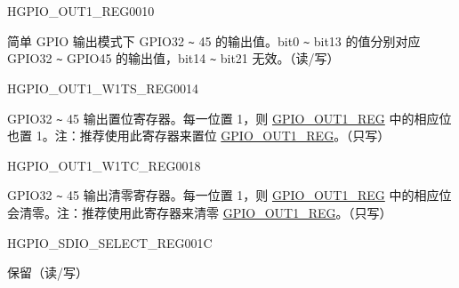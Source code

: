 \begin{register}{H}{GPIO\_OUT1\_REG}{\hexprefix{}0010}\label{regdesc:GPIOOUT1REG}
%
%
\regnewline%
\begin{regdesc}\begin{reglist}
\label{fielddesc:GPIOOUT1DATAORIG}\item [GPIO\_OUT1\_DATA\_ORIG] 简单 GPIO 输出模式下 GPIO32 \verb+~+ 45 的输出值。bit0 \verb+~+ bit13 的值分别对应 GPIO32 \verb+~+ GPIO45 的输出值，bit14 \verb+~+ bit21 无效。（读/写）
\end{reglist}\end{regdesc}
\end{register}


\begin{register}{H}{GPIO\_OUT1\_W1TS\_REG}{\hexprefix{}0014}\label{regdesc:GPIOOUT1W1TSREG}
%
%
\regnewline%
\begin{regdesc}\begin{reglist}
\label{fielddesc:GPIOOUT1W1TS}\item [GPIO\_OUT1\_W1TS] GPIO32 \verb+~+ 45 输出置位寄存器。每一位置 1，则 \hyperref[regdesc:GPIOOUT1REG]{GPIO\_OUT1\_REG} 中的相应位也置 1。注：推荐使用此寄存器来置位 \hyperref[regdesc:GPIOOUT1REG]{GPIO\_OUT1\_REG}。（只写）
\end{reglist}\end{regdesc}
\end{register}


\begin{register}{H}{GPIO\_OUT1\_W1TC\_REG}{\hexprefix{}0018}\label{regdesc:GPIOOUT1W1TCREG}
%
%
\regnewline%
\begin{regdesc}\begin{reglist}
\label{fielddesc:GPIOOUT1W1TC}\item [GPIO\_OUT1\_W1TC] GPIO32 \verb+~+ 45 输出清零寄存器。每一位置 1，则 \hyperref[regdesc:GPIOOUT1REG]{GPIO\_OUT1\_REG} 中的相应位会清零。注：推荐使用此寄存器来清零 \hyperref[regdesc:GPIOOUT1REG]{GPIO\_OUT1\_REG}。（只写）
\end{reglist}\end{regdesc}
\end{register}


\begin{register}{H}{GPIO\_SDIO\_SELECT\_REG}{\hexprefix{}001C}\label{regdesc:GPIOSDIOSELECTREG}
%
%
\regnewline%
\begin{regdesc}\begin{reglist}
\label{fielddesc:GPIOSDIOSEL}\item [GPIO\_SDIO\_SEL] 保留（读/写）
\end{reglist}\end{regdesc}
\end{register}


